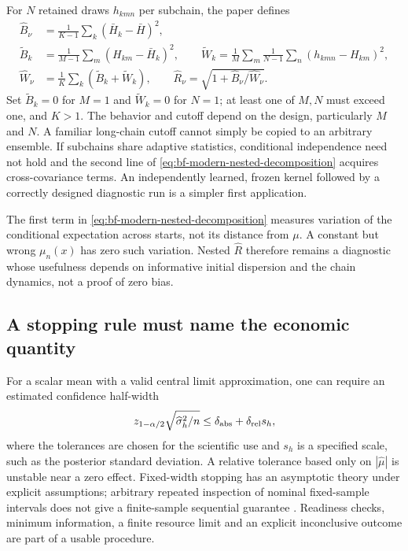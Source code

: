 For $N$ retained draws $h_{kmn}$ per subchain, the paper defines
\begin{align}
 \widehat B_\nu&=\frac1{K-1}\sum_k(\bar H_k-\bar H)^2,\\
 \widetilde B_k&=\frac1{M-1}\sum_m(H_{km}-\bar H_k)^2,\qquad
 \widetilde W_k=\frac1M\sum_m\frac1{N-1}
                    \sum_n(h_{kmn}-H_{km})^2,\\
 \widehat W_\nu&=\frac1K\sum_k(\widetilde B_k+\widetilde W_k),
 \qquad
 \widehat R_\nu=\sqrt{1+\widehat B_\nu/\widehat W_\nu}.
 \label{eq:bf-modern-nested-rhat}
\end{align}
Set $\widetilde B_k=0$ for $M=1$ and $\widetilde W_k=0$ for $N=1$;
at least one of $M,N$ must exceed one, and $K>1$.
The behavior and cutoff depend on the design, particularly $M$ and $N$.
A familiar long-chain cutoff cannot simply be copied to an arbitrary
ensemble. If subchains share adaptive statistics, conditional independence
need not hold and the second line of
\eqref{eq:bf-modern-nested-decomposition} acquires cross-covariance terms.
An independently learned, frozen kernel followed by a correctly designed
diagnostic run is a simpler first application.

The first term in \eqref{eq:bf-modern-nested-decomposition} measures
variation of the conditional expectation across starts, not its distance
from $\mu$. A constant but wrong $\mu_n(x)$ has zero such variation.
Nested $\widehat R$ therefore remains a diagnostic whose usefulness depends
on informative initial dispersion and the chain dynamics, not a proof of
zero bias.

\subsection{A stopping rule must name the economic quantity}

For a scalar mean with a valid central limit approximation, one can require
an estimated confidence half-width
\begin{equation}
 z_{1-\alpha/2}\sqrt{\widehat\sigma_h^2/n}
       \leq \delta_{\rm abs}+\delta_{\rm rel}s_h ,
 \label{eq:bf-modern-fixed-width}
\end{equation}
where the tolerances are chosen for the scientific use and $s_h$ is a
specified scale, such as the posterior standard deviation. A relative
tolerance based only on $|\widehat\mu|$ is unstable near a zero effect.
Fixed-width stopping has an asymptotic theory under explicit assumptions;
arbitrary repeated inspection of nominal fixed-sample intervals does not
give a finite-sample sequential guarantee \citep{flegalgongfixedwidth}.
Readiness checks, minimum information, a finite resource limit and an
explicit inconclusive outcome are part of a usable procedure.

